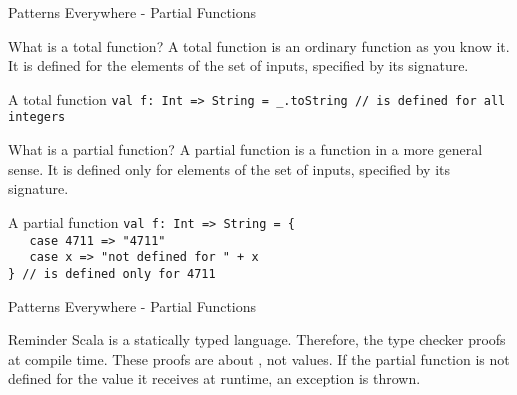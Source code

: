 \begin{frame}[fragile]{Patterns Everywhere - Partial Functions}
\begin{block}{What is a total function?}
A total function is an ordinary function as you know it. It is defined for
 the elements of the set of inputs, specified by its signature.
\end{block}
\pause
\begin{exampleblock}{A total function}
\lstinline!val f: Int => String = _.toString // is defined for all integers!
\end{exampleblock}
\pause
\begin{block}{What is a partial function?}
A partial function is a function in a more general sense. It is defined only for
 elements of the set of inputs, specified by its signature.
\end{block}
\pause
\begin{exampleblock}{A partial function}
\lstinline!val f: Int => String = {!\\
\lstinline!   case 4711 => "4711"!\\
\lstinline!   case x => "not defined for " + x!\\
\lstinline!} // is defined only for 4711!
\end{exampleblock}
\end{frame}

\begin{frame}[fragile]{Patterns Everywhere - Partial Functions}
\begin{alertblock}{Reminder}
Scala is a statically typed language. Therefore, the type checker
 proofs at compile time. These proofs are about
, not \alert{values}. If the partial function is not defined
for the value it receives at runtime, an exception is thrown.
\end{alertblock}
\end{frame}

